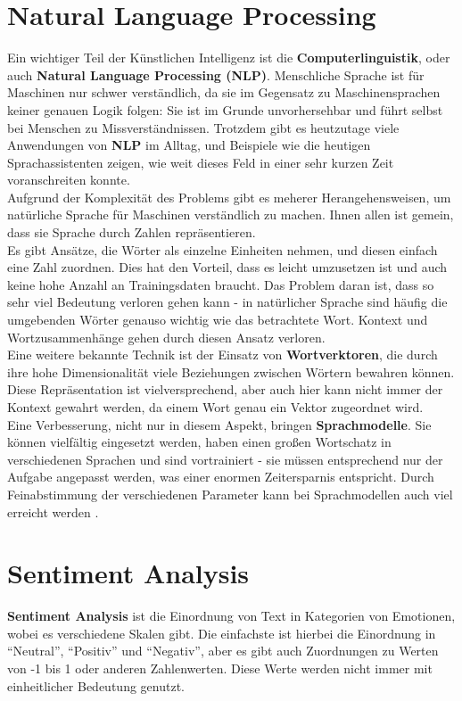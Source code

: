 \section{Natural Language Processing}
Ein wichtiger Teil der K\"unstlichen Intelligenz ist die \textbf{Computerlinguistik}, oder auch \textbf{Natural Language Processing (NLP)}. Menschliche Sprache ist f\"ur Maschinen nur schwer verst\"andlich, da sie im Gegensatz zu Maschinensprachen keiner genauen Logik folgen: Sie ist im Grunde unvorhersehbar und f\"uhrt selbst bei Menschen zu Missverst\"andnissen. Trotzdem gibt es heutzutage viele Anwendungen von \textbf{NLP} im Alltag, und Beispiele wie die heutigen Sprachassistenten zeigen, wie weit dieses Feld in einer sehr kurzen Zeit voranschreiten konnte.\\
Aufgrund der Komplexit\"at des Problems gibt es meherer Herangehensweisen, um nat\"urliche Sprache f\"ur Maschinen verst\"andlich zu machen. Ihnen allen ist gemein, dass sie Sprache durch Zahlen repr\"asentieren. \\
Es gibt Ans\"atze, die W\"orter als einzelne Einheiten nehmen, und diesen einfach eine Zahl zuordnen. Dies hat den Vorteil, dass es leicht umzusetzen ist und auch keine hohe Anzahl an Trainingsdaten braucht. Das Problem daran ist, dass so sehr viel Bedeutung verloren gehen kann - in nat\"urlicher Sprache sind h\"aufig die umgebenden W\"orter genauso wichtig wie das betrachtete Wort. Kontext und Wortzusammenh\"ange gehen durch diesen Ansatz verloren.\\
Eine weitere bekannte Technik ist der Einsatz von \textbf{Wortverktoren}, die durch ihre hohe Dimensionalit\"at viele Beziehungen zwischen W\"ortern bewahren k\"onnen. Diese Repr\"asentation ist vielversprechend, aber auch hier kann nicht immer der Kontext gewahrt werden, da einem Wort genau ein Vektor zugeordnet wird.\\
Eine Verbesserung, nicht nur in diesem Aspekt, bringen \textbf{Sprachmodelle}. Sie k\"onnen vielf\"altig eingesetzt werden, haben einen gro{\ss}en Wortschatz in verschiedenen Sprachen und sind vortrainiert - sie m\"ussen entsprechend nur der Aufgabe angepasst werden, was einer enormen Zeitersparnis entspricht. Durch Feinabstimmung der verschiedenen Parameter kann bei Sprachmodellen auch viel erreicht werden \cite{imagenet_moment}.

\section{Sentiment Analysis}
\textbf{Sentiment Analysis} ist die Einordnung von Text in Kategorien von Emotionen, wobei es verschiedene Skalen gibt. Die einfachste ist hierbei die Einordnung in "`Neutral"', "`Positiv"' und "`Negativ"', aber es gibt auch Zuordnungen zu Werten von -1 bis 1 oder anderen Zahlenwerten. Diese Werte werden nicht immer mit einheitlicher Bedeutung genutzt. 



